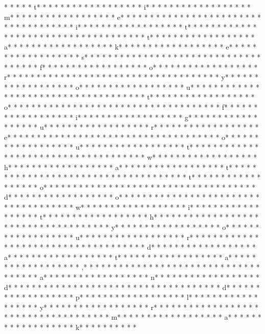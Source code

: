 *  * * *  * t* * *  * * *  * * *  *  * * *  *  * * *  * i* * *  * * *  * * *  *  * * *  *  * * *  * m* * *  * * *  * * *  *  * * *  *  * * *  * e* * *  * * *  * * *  *  * * *  *  * * *  *  * * *  * * *  * * *  *  * * *  *  * * *  * i* * *  * * *  * * *  *  * * *  *  * * *  * t* * *  * * *  * * *  *  * * *  *  * * *  *  * * *  * * *  * * *  *  * * *  *  * * *  * t* * *  * * *  * * *  *  * * *  *  * * *  * a* * *  * * *  * * *  *  * * *  *  * * *  * k* * *  * * *  * * *  *  * * *  *  * * *  * e* * *  * * *  * * *  *  * * *  *  * * *  * s* * *  * * *  * * *  *  * * *  *  * * *  *  * * *  * * *  * * *  *  * * *  *  * * *  * f* * *  * * *  * * *  *  * * *  *  * * *  * o* * *  * * *  * * *  *  * * *  *  * * *  * r* * *  * * *  * * *  *  * * *  *  * * *  *  * * *  * * *  * * *  *  * * *  *  * * *  * y* * *  * * *  * * *  *  * * *  *  * * *  * o* * *  * * *  * * *  *  * * *  *  * * *  * u* * *  * * *  * * *  *  * * *  *  * * *  *  * * *  * * *  * * *  *  * * *  *  * * *  * t* * *  * * *  * * *  *  * * *  *  * * *  * o* * *  * * *  * * *  *  * * *  *  * * *  *  * * *  * * *  * * *  *  * * *  *  * * *  * f* * *  * * *  * * *  *  * * *  *  * * *  * i* * *  * * *  * * *  *  * * *  *  * * *  * g* * *  * * *  * * *  *  * * *  *  * * *  * u* * *  * * *  * * *  *  * * *  *  * * *  * r* * *  * * *  * * *  *  * * *  *  * * *  * e* * *  * * *  * * *  *  * * *  *  * * *  *  * * *  * * *  * * *  *  * * *  *  * * *  * o* * *  * * *  * * *  *  * * *  *  * * *  * u* * *  * * *  * * *  *  * * *  *  * * *  * t* * *  * * *  * * *  *  * * *  *  * * *  *  * * *  * * *  * * *  *  * * *  *  * * *  * w* * *  * * *  * * *  *  * * *  *  * * *  * h* * *  * * *  * * *  *  * * *  *  * * *  * a* * *  * * *  * * *  *  * * *  *  * * *  * t* * *  * * *  * * *  *  * * *  *  * * *  *  * * *  * * *  * * *  *  * * *  *  * * *  * t* * *  * * *  * * *  *  * * *  *  * * *  * o* * *  * * *  * * *  *  * * *  *  * * *  *  * * *  * * *  * * *  *  * * *  *  * * *  * d* * *  * * *  * * *  *  * * *  *  * * *  * o* * *  * * *  * * *  *  * * *  *  * * *  *  * * *  * * *  * * *  *  * * *  *  * * *  * w* * *  * * *  * * *  *  * * *  *  * * *  * i* * *  * * *  * * *  *  * * *  *  * * *  * t* * *  * * *  * * *  *  * * *  *  * * *  * h* * *  * * *  * * *  *  * * *  *  * * *  *  * * *  * * *  * * *  *  * * *  *  * * *  * y* * *  * * *  * * *  *  * * *  *  * * *  * o* * *  * * *  * * *  *  * * *  *  * * *  * u* * *  * * *  * * *  *  * * *  *  * * *  * r* * *  * * *  * * *  *  * * *  *  * * *  *  * * *  * * *  * * *  *  * * *  *  * * *  * d* * *  * * *  * * *  *  * * *  *  * * *  * a* * *  * * *  * * *  *  * * *  *  * * *  * t* * *  * * *  * * *  *  * * *  *  * * *  * a* * *  * * *  * * *  *  * * *  *  * * *  * ,* * *  * * *  * * *  *  * * *  *  * * *  *  * * *  * * *  * * *  *  * * *  *  * * *  * a* * *  * * *  * * *  *  * * *  *  * * *  * n* * *  * * *  * * *  *  * * *  *  * * *  * d* * *  * * *  * * *  *  * * *  *  * * *  *  * * *  * * *  * * *  *  * * *  *  * * *  * d* * *  * * *  * * *  *  * * *  *  * * *  * p* * *  * * *  * * *  *  * * *  *  * * *  * l* * *  * * *  * * *  *  * * *  *  * * *  * y* * *  * * *  * * *  *  * * *  *  * * *  * r* * *  * * *  * * *  *  * * *  *  * * *  *  * * *  * * *  * * *  *  * * *  *  * * *  * m* * *  * * *  * * *  *  * * *  *  * * *  * a* * *  * * *  * * *  *  * * *  *  * * *  * k* * *  * * *  * * *  * 
